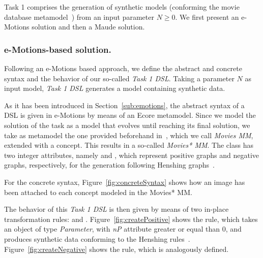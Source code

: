
Task 1 comprises the generation of synthetic models (conforming the movie database metamodel~\cite{imdbcase}) from an input parameter $N \geq 0$. We first present an e-Motions solution and then a Maude solution. 


\subsubsection{e-Motions-based solution.}

Following an e-Motions based approach, we define the abstract and concrete syntax and the behavior of our so-called \textit{Task 1 DSL}. Taking a parameter $N$ as input model, \textit{Task 1 DSL} generates a model containing synthetic data.

As it has been introduced in Section~\ref{sub:emotions}, the abstract syntax of a DSL is given in e-Motions by means of an Ecore metamodel. Since we model the solution of the task as a model that evolves until reaching its final solution, we take as metamodel the one provided beforehand in~\cite{imdbsources}, which we call \textit{Movies MM}, extended with a  concept. This results in a so-called \textit{Movies* MM}. The class  has two integer attributes, namely  and , which represent positive graphs and negative graphs, respectively, for the generation following Henshing graphs~\cite{Henshin:10}.

For the concrete syntax, Figure~\ref{fig:concreteSyntax} shows how an image has been attached to each concept modeled in the Movies* MM. 

The behavior of this \textit{Task 1 DSL} is then given by means of two in-place transformation rules:  and . Figure~\ref{fig:createPositive} shows the  rule, which takes an object  of type \textit{Parameter}, with \textit{nP} attribute greater or equal than $0$, and produces synthetic data conforming to the Henshing rules~\cite{Henshin:10}. Figure~\ref{fig:createNegative} shows the  rule, which is analogously defined.

